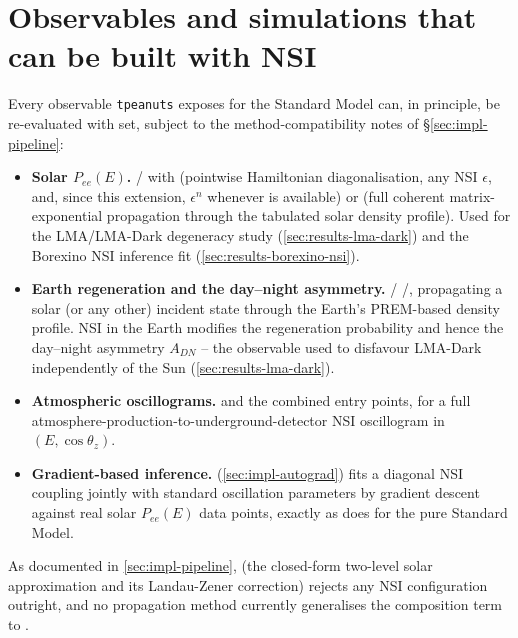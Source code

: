 \section{Observables and simulations that can be built with NSI}

\begin{implbox}
Every observable \texttt{tpeanuts} exposes for the Standard Model can, in
principle, be re-evaluated with  set, subject to the
method-compatibility notes of \S\ref{sec:impl-pipeline}:
\begin{itemize}
  \item \textbf{Solar $P_{ee}(E)$.} /
     with 
    (pointwise Hamiltonian diagonalisation, any NSI $\epsilon$, and, since
    this extension, $\epsilon^n$ whenever  is
    available) or  (full coherent matrix-exponential
    propagation through the tabulated solar density profile). Used for the
    LMA/LMA-Dark degeneracy study (\cref{sec:results-lma-dark}) and the
    Borexino NSI inference fit (\cref{sec:results-borexino-nsi}).
  \item \textbf{Earth regeneration and the day--night asymmetry.}
    /
    /, propagating a solar (or any
    other) incident state through the Earth's PREM-based density profile.
    NSI in the Earth modifies the regeneration probability and hence the
    day--night asymmetry $A_{DN}$ -- the observable used to disfavour
    LMA-Dark independently of the Sun (\cref{sec:results-lma-dark}).
  \item \textbf{Atmospheric oscillograms.}
    and the combined  entry points, for a
    full atmosphere-production-to-underground-detector NSI oscillogram in
    $(E,\cos\theta_z)$.
  \item \textbf{Gradient-based inference.} 
    (\cref{sec:impl-autograd}) fits a diagonal NSI coupling jointly with
    standard oscillation parameters by gradient descent against real solar
    $P_{ee}(E)$ data points, exactly as 
    does for the pure Standard Model.
\end{itemize}
\end{implbox}

\begin{notebox}
As documented in \cref{sec:impl-pipeline}, 
(the closed-form two-level solar approximation and its Landau-Zener
correction) rejects any NSI configuration outright, and no propagation
method currently generalises the composition term to
.
\end{notebox}
